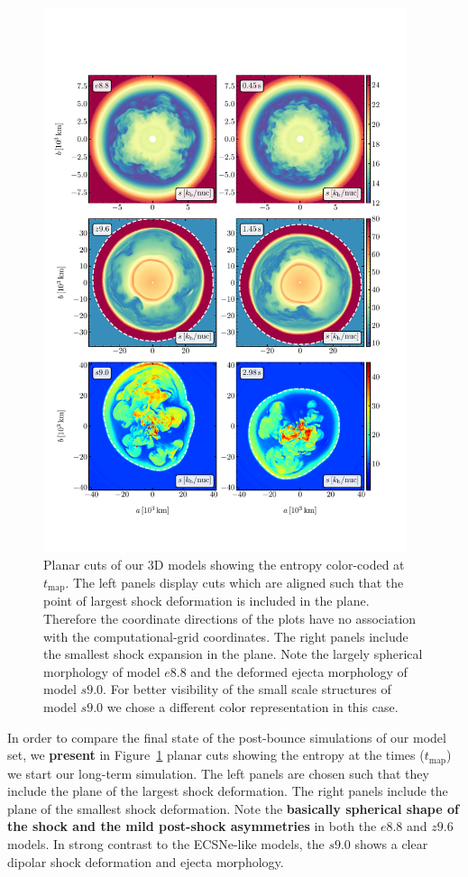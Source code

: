 \documentclass[fleqn,usenatbib]{mnras}
\begin{document}
\begin{figure}
 \centering
 \includegraphics[width=0.95\textwidth,trim=0cm 1.8cm 0cm 3cm,clip]{pic/all_3d_sto_slices_time_0.pdf}
 \caption{Planar cuts of our 3D models showing the entropy color-coded at $t_{\mathrm{map}}$. The left panels display cuts which are aligned such that the point of largest shock deformation is included in the plane. Therefore the coordinate directions of the plots have no association with the computational-grid coordinates. The right panels include the smallest shock expansion in the plane. Note the largely spherical morphology of model $e8.8$ and the deformed ejecta morphology of model $s9.0$. For better visibility of the small scale structures of model $s9.0$ we chose a different color representation in this case.}
 \label{fig:slices first mapping}
\end{figure}
In order to compare the final state of the post-bounce simulations of our model set, we \textbf{present} in Figure~\ref{fig:slices first mapping} planar cuts showing the entropy at the times ($t_{\mathrm{map}}$) we start our long-term simulation. The left panels are chosen such that they include the plane of the largest shock deformation. The right panels include the plane of the smallest shock deformation.
Note the \textbf{basically spherical shape of the shock and the mild post-shock asymmetries} in both the $e8.8$ and $z9.6$ models.
In strong contrast to the ECSNe-like models, the $s9.0$ shows a clear dipolar shock deformation and ejecta morphology. 
\end{document}
